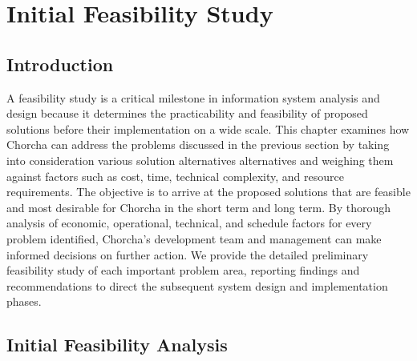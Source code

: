 \documentclass[12pt,a4paper,oneside]{book}
\begin{document}
\newpage

\chapter{Initial Feasibility Study}
\thispagestyle{empty}  
\section{Introduction}
A feasibility study is a critical milestone in information system analysis and design because it determines the practicability and feasibility of proposed solutions before their implementation on a wide scale. This chapter examines how Chorcha can address the problems discussed in the previous section by taking into consideration various solution alternatives alternatives and weighing them against factors such as cost, time, technical
complexity, and resource requirements. The objective is to arrive at the proposed solutions that are feasible and most desirable for Chorcha in the short term and long term. By thorough analysis of economic, operational, technical, and schedule factors for every problem identified, Chorcha's development team and management can make informed decisions on further action. We provide the detailed preliminary feasibility study of each important problem area, reporting findings and recommendations to direct the subsequent system design and implementation phases.

\section{Initial Feasibility Analysis}
\end{document}
